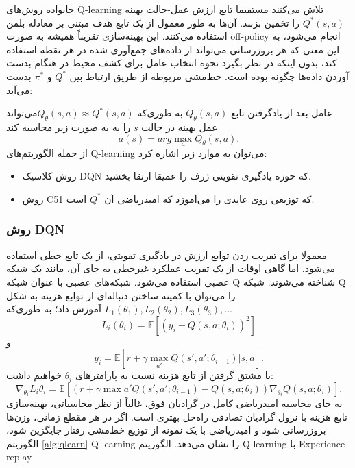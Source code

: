 خانواده روش‌های  Q-learning تلاش می‌کنند مستقیما تابع ارزش عمل-حالت بهینه $Q^*(s,a)$ را تخمین بزنند. آن‌ها به طور معمول از یک تابع هدف مبتنی بر معادله بلمن استفاده می‌کنند. این بهینه‌سازی تقریباً همیشه به صورت off-policy انجام می‌شود، به این معنی که هر بروزرسانی می‌تواند از داده‌های جمع‌آوری شده در هر نقطه استفاده کند، بدون اینکه در نظر بگیرد نحوه انتخاب عامل برای کشف محیط در هنگام بدست آوردن داده‌ها چگونه بوده است. خط‌مشی مربوطه از طریق ارتباط بین 
$Q^*$
و
$\pi^*$
 بدست می‌آید: 
 
 عامل بعد از یادگرفتن تابع $Q_\theta(s,a)$ به طوری‌که  $Q_\theta(s,a) \approx Q^*(s,a)$می‌تواند عمل بهینه در حالت $s$ را به به صورت زیر محاسبه کند $$a(s) = arg \max_a Q_{\theta}(s,a).$$
از جمله الگوریتم‌های Q-learning می‌توان به موارد زیر اشاره کرد:
\begin{itemize}
\item روش کلاسیک DQN که حوزه یادگیری تقویتی ژرف را عمیقا ارتقا بخشید.
\item روش C51 که توزیعی روی عایدی را می‌آموزد که امیدریاضی آن $Q^*$ است.
\end{itemize}
\subsubsection{روش DQN}
معمولا برای تقریب زدن توابع ارزش در یادگیری تقویتی، از یک تابع خطی استفاده می‌شود.
اما گاهی اوقات از یک تقریب عملکرد غیرخطی به جای آن، مانند یک شبکه عصبی استفاده می‌شود. شبکه‌های عصبی با عنوان شبکه Q شناخته می‌شوند.
شبکه Q را می‌توان با کمینه ساختن دنباله‌ای از توابع هزینه به شکل 
$L_1(\theta_1), L_2(\theta_2), L_3(\theta_3), ... $ آموزش داد؛ به طوری‌که
$$L_i(\theta_i)=\mathbb{E}\left[(y_i - Q(s,a;\theta_i))^2\right]$$  و  $$y_i = \mathbb{E}[r + \gamma \max_{a'} Q(s',a'; \theta_{i-1})| s,a].$$ با مشتق گرفتن از تابع هزینه نسبت به پارامترهای $\theta_i$  خواهیم داشت: $$\nabla_{\theta_i} L_i{\theta_i} = \mathbb{E}\left[ \left(r + \gamma \max{a'} Q(s',a';\theta_{i-1}) - Q(s,a;\theta_i)\right) \nabla_{\theta_i} Q(s,a;\theta_i)\right].$$
به جای محاسبه امیدریاضی کامل در گرادیان فوق، غالباً از نظر محاسباتی، بهینه‌سازی تابع هزینه با نزول گرادیان تصادفی   راه‌حل بهتری است. اگر در هر مقطع زمانی، وزن‌ها بروزرسانی شود و امیدریاضی با یک نمونه از توزیع خط‌مشی رفتار  جایگزین شود، الگوریتم
\ref{alg:qlearn}
 Q-learning را نشان می‌دهد.
{الگوریتم Q-learning با Experience replay}

